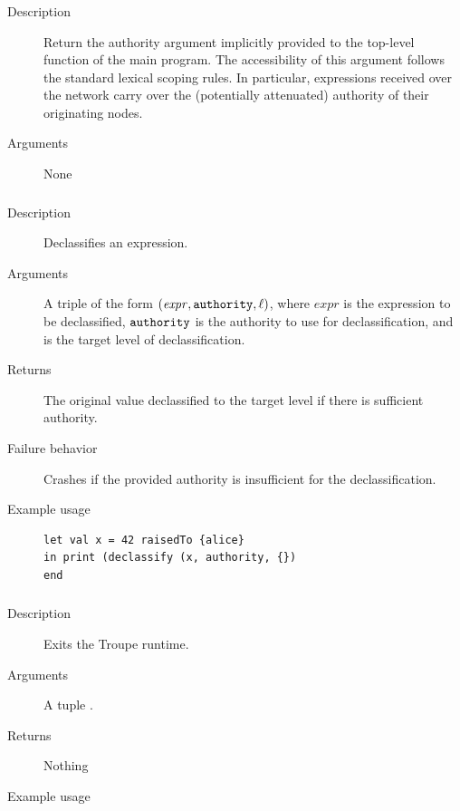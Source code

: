 \subsubsection{}

\begin{description}
    \item [Description] Return the authority argument implicitly provided to the top-level function of the main program.
The accessibility of this argument follows the standard lexical scoping rules. In particular, expressions received over the network carry over the (potentially attenuated) authority of their originating nodes.
    \item [Arguments] None
\end{description}

\subsubsection{}
\begin{description}
    \item [Description] Declassifies an expression.
    \item [Arguments] A triple of the form $(\mathit{expr}, {\mathtt{authority}}, {\mathtt{\ell}} )$, where $\mathit{expr}$ is the expression to be declassified, ${\mathtt{authority}}$ is the authority to use for declassification, and \code{\ell} is the target level of declassification.
    \item [Returns] The original value declassified to the target level if there is sufficient authority. 
    \item [Failure behavior] Crashes if the provided authority is insufficient for the declassification.
    \item [Example usage] 
\begin{minipage}[t]{30em}
\begin{verbatim}
let val x = 42 raisedTo {alice}
in print (declassify (x, authority, {})
end    
\end{verbatim}


 \end{minipage}

    
\end{description}


\subsubsection{}
\begin{description}
    \item [Description] Exits the Troupe runtime.
    \item [Arguments] A tuple .
    \item [Returns] Nothing
    \item [Example usage] 
\end{description}


